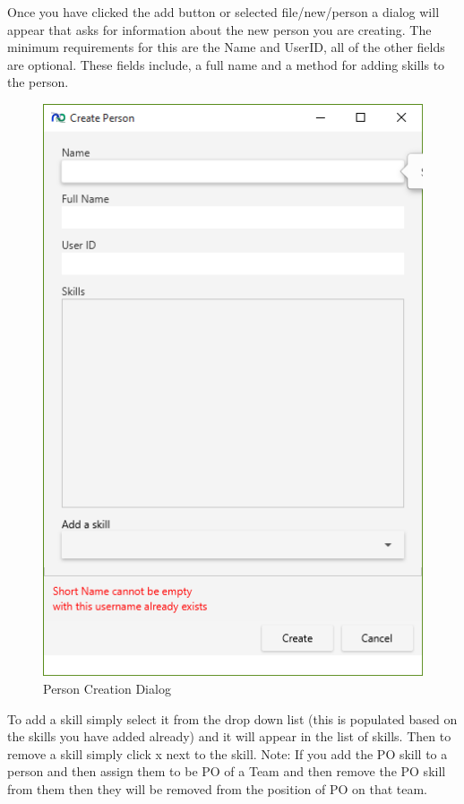 Once you have clicked the add button or selected file/new/person a dialog will appear that asks for information about the new person you are creating. The minimum requirements for this are the Name and UserID, all of the other fields are optional. These fields include, a full name and a method for adding skills to the person.

\begin{figure}[H]
\centering
\includegraphics[width=\textwidth]{images/screenshots/people2.PNG}
\caption{Person Creation Dialog}
\label{fig:new_project}
\end{figure}

To add a skill simply select it from the drop down list (this is populated based on the skills you have added already) and it will appear in the list of skills. Then to remove a skill simply click x next to the skill. Note: If you add the PO skill to a person and then assign them to be PO of a Team and then remove the PO skill from them then they will be removed from the position of PO on that team.

